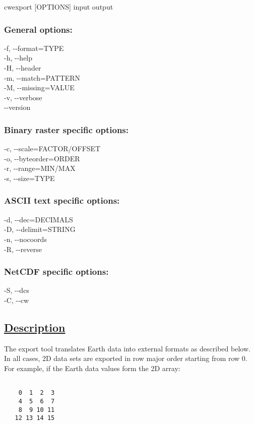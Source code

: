  cwexport [OPTIONS] input output
\subsubsection*{General options:}


  -f, -{-}format=TYPE \\ 
 -h, -{-}help \\ 
 -H, -{-}header \\ 
 -m, -{-}match=PATTERN \\ 
 -M, -{-}missing=VALUE \\ 
 -v, -{-}verbose \\ 
 -{-}version \\ 

\subsubsection*{Binary raster specific options:}


  -c, -{-}scale=FACTOR/OFFSET \\ 
 -o, -{-}byteorder=ORDER \\ 
 -r, -{-}range=MIN/MAX \\ 
 -s, -{-}size=TYPE \\ 

\subsubsection*{ASCII text specific options:}


  -d, -{-}dec=DECIMALS \\ 
 -D, -{-}delimit=STRING \\ 
 -n, -{-}nocoords \\ 
 -R, -{-}reverse \\ 

\subsubsection*{NetCDF specific options:}


  -S, -{-}dcs \\ 
 -C, -{-}cw \\ 

\subsection*{\underline{Description}}


  The export tool translates Earth data into external formats as described below. In all cases, 2D data sets are exported in row major order starting from row 0. For example, if the Earth data values form the 2D array:
\begin{verbatim}

    0  1  2  3
    4  5  6  7
    8  9 10 11
   12 13 14 15
 
\end{verbatim}


